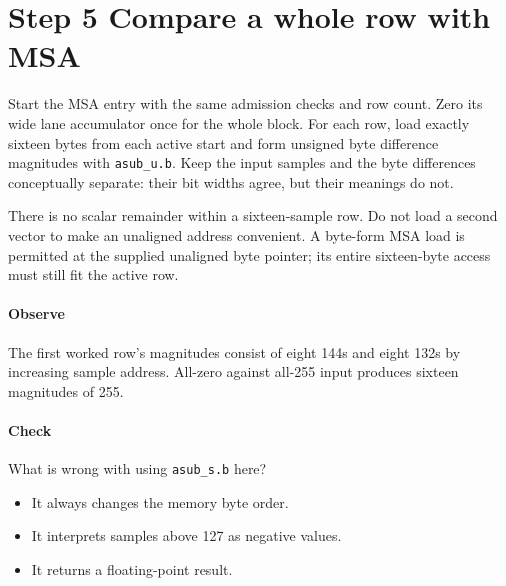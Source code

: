 \section{Step 5 Compare a whole row with MSA}\label{h263-sad-s05}
Start the MSA entry with the same admission checks and row count. Zero its wide
lane accumulator once for the whole block. For each row, load exactly sixteen
bytes from each active start and form unsigned byte difference magnitudes with
\texttt{asub\_u.b}. Keep the input samples and the byte differences conceptually
separate: their bit widths agree, but their meanings do not.

There is no scalar remainder within a sixteen-sample row. Do not load a second
vector to make an unaligned address convenient. A byte-form MSA load is permitted
at the supplied unaligned byte pointer; its entire sixteen-byte access must still
fit the active row.

\paragraph{Observe} The first worked row's magnitudes consist of eight 144s and
eight 132s by increasing sample address. All-zero against all-255 input produces
sixteen magnitudes of 255.
\paragraph{Check} What is wrong with using \texttt{asub\_s.b} here?
\begin{itemize}
  \item[A.] It always changes the memory byte order.
  \item[B.] It interprets samples above 127 as negative values.
  \item[C.] It returns a floating-point result.
\end{itemize}

